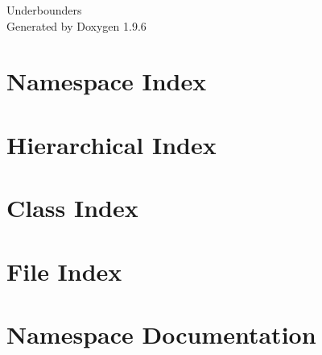 \documentclass[twoside]{book}
\newcommand{\+}{\discretionary{\mbox{\scriptsize$\hookleftarrow$}}{}{}}
\newcommand{\clearemptydoublepage}{%
    \newpage{\pagestyle{empty}\cleardoublepage}%
  }
\begin{document}
  \raggedbottom
    \hypersetup{pageanchor=false,
                bookmarksnumbered=true,
                pdfencoding=unicode
               }
  \begin{titlepage}
  \vspace*{7cm}
  \begin{center}%
  {\Large Underbounders}\\
  \vspace*{1cm}
  {\large Generated by Doxygen 1.9.6}\\
  \end{center}
  \end{titlepage}
  \clearemptydoublepage
  \tableofcontents
  \clearemptydoublepage
  \hypersetup{pageanchor=true}
\chapter{Namespace Index}

\chapter{Hierarchical Index}

\chapter{Class Index}

\chapter{File Index}

\chapter{Namespace Documentation}

\end{document}
